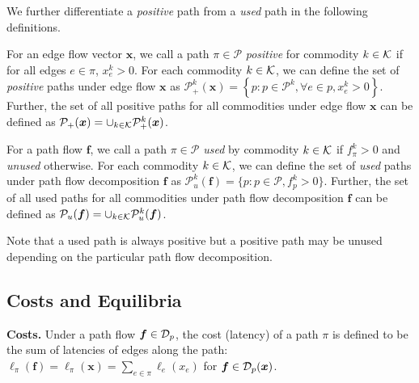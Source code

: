We further differentiate a \emph{positive} path from a \emph{used} path in the following definitions.
 
\begin{definition}
For an edge flow vector $\bm{x}$, we call a path $\pi\in \mathcal{P}$ \emph{positive} for commodity $k \in \mathcal{K}$ if for all edges $e \in \pi$, $x_{e}^k > 0$.  
For each commodity $k \in \mathcal{K}$, we can define the set of \emph{positive} paths under edge flow $\bm{x}$ as $\mathcal{P}_{+}^k(\bm{x}) = \left\{p: p \in \mathcal{P}^k, \forall e \in p, x_e^k>0  \right\}$.  Further, the set of all positive paths for all commodities under edge flow $\bm{x}$ can be defined as $\mathcal{P}_{+}(\bm{x}) = \cup_{k \in \mathcal{K}} \mathcal{P}_{+}^k(\bm{x})$.
\end{definition}
     
\begin{definition}
For a path flow $\bm{f}$, we call a path $\pi\in \mathcal{P}$ \emph{used} by commodity $k \in \mathcal{K}$ if $f_{\pi}^k > 0$ and \emph{unused} otherwise. For each commodity $k \in \mathcal{K}$, we can define the set of \emph{used} paths under path flow decomposition $\bm{f}$ as $\mathcal{P}_u^k(\bm{f}) = \{p: p\in \mathcal{P}, f_p^k >0\}$.  Further, the set of all used paths for all commodities under path flow decomposition $\bm{f}$ can be defined as $\mathcal{P}_u(\bm{f}) = \cup_{k \in \mathcal{K}} \mathcal{P}_u^k(\bm{f})$.
\end{definition}

\begin{remark}
Note that a used path is always positive but a positive path may be unused depending on the particular path flow decomposition.
\end{remark}

\subsection{Costs and Equilibria}
\textbf{Costs.} Under a path flow $\bm{f} \in \mathcal{D}_p$, the cost (latency) of a path $\pi$ is defined to be the sum of latencies of edges along the path: 
$\ell_{\pi}(\bm{f}) = \ell_{\pi}(\bm{x})=\sum_{e \in \pi}\ell_e(x_e)$ for $\bm{f} \in \mathcal{D}_p(\bm{x})$.

